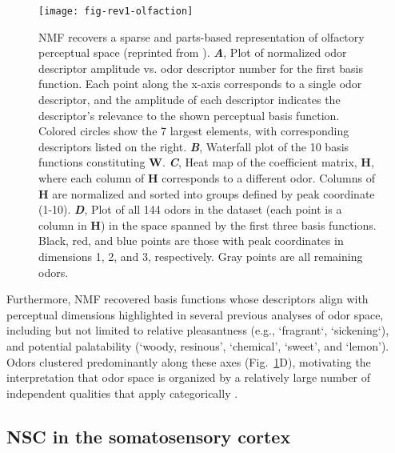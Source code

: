 \begin{figure}[ht]
	\centering
	\texttt{[image: fig-rev1-olfaction]}
    \caption{\ac{NMF} recovers a sparse and parts-based representation
    of olfactory perceptual space (reprinted  
    from \cite{Castro2013}).
       \textbf{\emph{A}},
          Plot of normalized odor descriptor amplitude vs. odor descriptor number for
          the first basis function. Each point along the x-axis corresponds to a single
          odor descriptor, and the amplitude of each descriptor indicates the
          descriptor's relevance to the shown perceptual basis function.
          Colored circles show the 7 largest elements, with corresponding descriptors
          listed on the right.
       \textbf{\emph{B}},
          Waterfall plot of the 10 basis functions constituting \textbf{W}.
       \textbf{\emph{C}},
          Heat map of the coefficient matrix, \textbf{H},
          where each column of \textbf{H} corresponds to a different odor.
          Columns of \textbf{H} are normalized and sorted into groups defined by
          peak coordinate (1-10).
       \textbf{\emph{D}},
          Plot of all 144 odors in the dataset (each point is a column in \textbf{H})
          in the space spanned by the first three basis functions.
          Black, red, and blue points are those with peak coordinates in dimensions
          1, 2, and 3, respectively. Gray points are all remaining odors.}
	\label{fig:evidence-olfaction}
\end{figure}

Furthermore, \ac{NMF} recovered basis functions whose descriptors align
with perceptual dimensions highlighted in several previous analyses of odor space,
including but not limited to relative pleasantness (e.g., `fragrant`, `sickening`), 
and potential palatability (`woody, resinous', `chemical', `sweet', and `lemon').
Odors clustered predominantly along these axes
(Fig.~\ref{fig:evidence-olfaction}D), 
motivating the interpretation that odor space is organized 
by a relatively large number of independent qualities that apply categorically
\cite{Castro2013}.


\subsection*{NSC in the somatosensory cortex}

